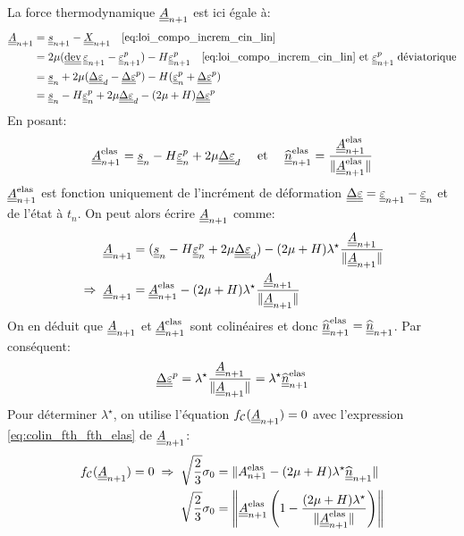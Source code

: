 \documentclass[10pt]{book}
\newcommand{\FthEpsp}{\ten{A}}
\begin{document}
\begin{appendices}
\begin{Demo}
{La force thermodynamique $\FthEpsp_{n+1}$ est ici égale à:
$$\begin{aligned}
\FthEpsp_{n+1}&=\devia_{n+1}-\CentreConv_{n+1} \quad \eqref{eq:loi_compo_increm_cin_lin}\\
&=2\mu(\dev\DefoHPP_{n+1}-\EpsP_{n+1})-H\EpsP_{n+1} \quad \eqref{eq:loi_compo_increm_cin_lin}\et \EpsP_{n+1} \; \text{déviatorique}\\
&=\devia_{n}+2\mu(\DeltaDefoHPP_{d}-\DeltaEpsP)-H(\EpsP_{n}+\DeltaEpsP) \\
&=\devia_{n}-H\DefoHPP_{n}^{p}+2\mu\DeltaDefoHPP_{d}-(2\mu+H)\DeltaEpsP
\end{aligned}$$
En posant:
\begin{equation*}
\FthEpsp_{n+1}^{\text{elas}}=\devia_{n}-H\DefoHPP_{n}^{p}+2\mu\DeltaDefoHPP_{d} \quad \et \quad \hat{\ten{n}}_{n+1}^{\text{elas}}=\frac{\FthEpsp_{n+1}^{\text{elas}}}{\Vert\FthEpsp_{n+1}^{\text{elas}}\Vert}
\end{equation*}
$\FthEpsp_{n+1}^{\text{elas}}$ est fonction uniquement de l'incrément de déformation $\DeltaDefoHPP=\DefoHPP_{n+1}-\DefoHPP_{n}$ et de l'état à $t_{n}$. On peut alors écrire $\FthEpsp_{n+1}$ comme:
\begin{align}
\FthEpsp_{n+1}&=(\devia_{n}-H\DefoHPP^{p}_{n}+2\mu\DeltaDefoHPP_{d})-(2\mu+H)\lambda^{\star}\frac{\FthEpsp_{n+1}}{\Vert\FthEpsp_{n+1}\Vert}\\\label{eq:colin_fth_fth_elas}
\implique \FthEpsp_{n+1} &= \FthEpsp_{n+1}^{\text{elas}}-(2\mu+H)\lambda^{\star}\frac{\FthEpsp_{n+1}}{\Vert\FthEpsp_{n+1}\Vert}
\end{align}
On en déduit que $\FthEpsp_{n+1}$ et $\FthEpsp_{n+1}^{\text{elas}}$ sont colinéaires et donc $\hat{\ten{n}}_{n+1}^{\text{elas}}=\hat{\ten{n}}_{n+1}$. Par conséquent:
\begin{equation}
\DeltaEpsP=\lambda^{\star}\frac{\FthEpsp_{n+1}}{\Vert\FthEpsp_{n+1}\Vert}=\lambda^{\star}\hat{\ten{n}}^{\text{elas}}_{n+1}
\label{eq:6_80}
\end{equation}
Pour déterminer $\lambda^{\star}$, on utilise l'équation $\FChargeConvexe(\FthEpsp_{n+1})=0$ avec l'expression \eqref{eq:colin_fth_fth_elas} de $\FthEpsp_{n+1}$:
$$\begin{aligned}
\FChargeConvexe(\FthEpsp_{n+1})=0\implique \sqrt{\frac{2}{3}}\sigma_{0} &= \Vert A_{n+1}^{\text{elas}}-(2\mu+H)\lambda^{\star}\hat{\ten{n}}_{n+1}\Vert\\
\sqrt{\frac{2}{3}}\sigma_{0}&=\left\Vert\FthEpsp_{n+1}^{\text{elas}}\left(1-\frac{(2\mu+H)\lambda^{\star}}{\Vert\FthEpsp_{n+1}^{\text{elas}}\Vert}\right)\right\Vert\\

\end{aligned}$$}
\end{Demo}
\end{appendices}
\end{document}

